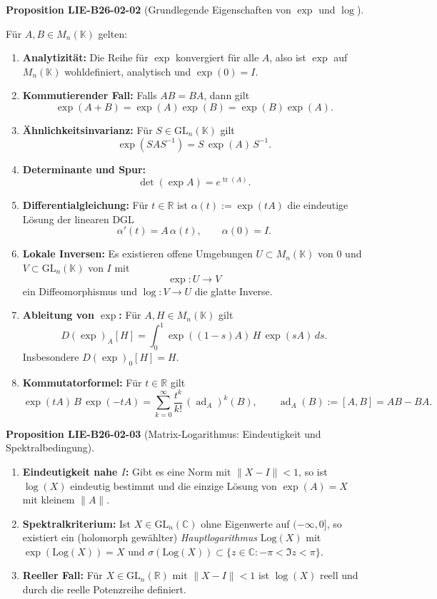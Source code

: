 \documentclass[10pt, letterpaper]{article}
\newcommand{\CustomHeading}[3]{%
  \par\medskip\noindent%
  \textbf{#1 #2} \textnormal{(#3)}.\enskip%
}
\newenvironment{PROP}[2]{\begin{unitbox}\CustomHeading{Proposition}{#1}{#2}}{\end{unitbox}}
\begin{document}
\begin{PROP}{LIE-B26-02-02}{Grundlegende Eigenschaften von $\exp$ und $\log$}
Für $A, B \in M_n(\mathbb{K})$ gelten:
\begin{enumerate}
\item \textbf{Analytizität:} Die Reihe für $\exp$ konvergiert für alle $A$, also ist $\exp$ auf $M_n(\mathbb{K})$ wohldefiniert, analytisch und $\exp(0)=I$.
\item \textbf{Kommutierender Fall:} Falls $AB = BA$, dann gilt
\[
\exp(A + B) = \exp(A)\exp(B) = \exp(B)\exp(A).
\]
\item \textbf{Ähnlichkeitsinvarianz:} Für $S \in \mathrm{GL}_n(\mathbb{K})$ gilt
\[
\exp(SAS^{-1}) = S\,\exp(A)\,S^{-1}.
\]
\item \textbf{Determinante und Spur:}
\[
\det(\exp A) = e^{\operatorname{tr}(A)}.
\]
\item \textbf{Differentialgleichung:} Für $t \in \mathbb{R}$ ist $\alpha(t) := \exp(tA)$ die eindeutige Lösung der linearen DGL
\[
\alpha'(t) = A\,\alpha(t), \qquad \alpha(0) = I.
\]
\item \textbf{Lokale Inversen:}  
Es existieren offene Umgebungen $U \subset M_n(\mathbb{K})$ von $0$ und $V \subset \mathrm{GL}_n(\mathbb{K})$ von $I$ mit
\[
\exp : U \to V
\]
ein Diffeomorphismus und $\log : V \to U$ die glatte Inverse.
\item \textbf{Ableitung von $\exp$:} Für $A,H \in M_n(\mathbb{K})$ gilt
\[
D(\exp)_A[H] = \int_0^1 \exp((1-s)A)\, H\, \exp(sA)\, ds.
\]
Insbesondere $D(\exp)_0[H] = H$.
\item \textbf{Kommutatorformel:} Für $t \in \mathbb{R}$ gilt
\[
\exp(tA)\,B\,\exp(-tA) = \sum_{k=0}^{\infty} \frac{t^k}{k!}\,(\operatorname{ad}_A)^k(B),
\qquad \operatorname{ad}_A(B) := [A,B] = AB - BA.
\]
\end{enumerate}
\end{PROP}



\begin{PROP}{LIE-B26-02-03}{Matrix-Logarithmus: Eindeutigkeit und Spektralbedingung}
\begin{enumerate}
\item \textbf{Eindeutigkeit nahe $I$:} Gibt es eine Norm mit $\|X - I\| < 1$, so ist $\log(X)$ eindeutig bestimmt und die einzige Lösung von $\exp(A) = X$ mit kleinem $\|A\|$.
\item \textbf{Spektralkriterium:}  
Ist $X \in \mathrm{GL}_n(\mathbb{C})$ ohne Eigenwerte auf $(-\infty,0]$, so existiert ein (holomorph gewählter) \emph{Hauptlogarithmus} $\mathrm{Log}(X)$ mit $\exp(\mathrm{Log}(X)) = X$ und $\sigma(\mathrm{Log}(X)) \subset \{ z \in \mathbb{C} : -\pi < \Im z < \pi \}$.
\item \textbf{Reeller Fall:} Für $X \in \mathrm{GL}_n(\mathbb{R})$ mit $\|X - I\| < 1$ ist $\log(X)$ reell und durch die reelle Potenzreihe definiert.
\end{enumerate}
\end{PROP}
\end{document}
